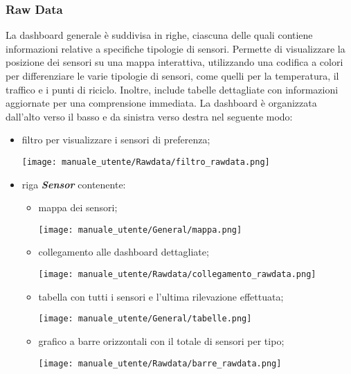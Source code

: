 \subsubsection{Raw Data}
La dashboard generale è suddivisa in righe, ciascuna delle quali contiene informazioni relative a specifiche tipologie di sensori. Permette di visualizzare la posizione dei sensori su una mappa interattiva, utilizzando una codifica a colori per differenziare le varie tipologie di sensori, come quelli per la temperatura, il traffico e i punti di riciclo. Inoltre, include tabelle dettagliate con informazioni aggiornate per una comprensione immediata. La dashboard è organizzata dall'alto verso il basso e da sinistra verso destra nel seguente modo:
\begin{itemize}
    \item filtro per visualizzare i sensori di preferenza;
    \begin{center}
        \texttt{[image: manuale\_utente/Rawdata/filtro\_rawdata.png]}
    \end{center} 
    \item riga \textit{\textbf{Sensor}} contenente:
    \begin{itemize}
        \item mappa dei sensori;
        \begin{center}
            \texttt{[image: manuale\_utente/General/mappa.png]}
        \end{center} 
        \item collegamento alle dashboard dettagliate;
        \begin{center}
            \texttt{[image: manuale\_utente/Rawdata/collegamento\_rawdata.png]}
        \end{center} 
        \item tabella con tutti i sensori e l'ultima rilevazione effettuata;
        \begin{center}
            \texttt{[image: manuale\_utente/General/tabelle.png]}
        \end{center} 
        \item grafico a barre orizzontali con il totale di sensori per tipo;
        \begin{center}
            \texttt{[image: manuale\_utente/Rawdata/barre\_rawdata.png]}

\end{center}
\end{itemize}
\end{itemize}
